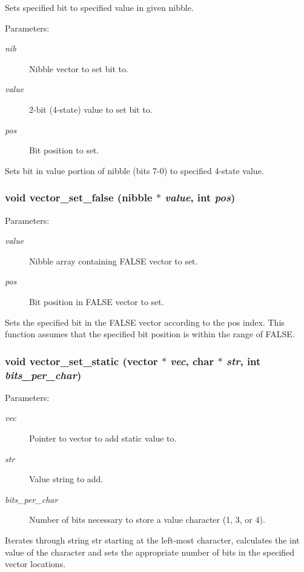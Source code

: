 Sets specified bit to specified value in given nibble. 

\begin{Desc}
\item[Parameters:]
\begin{description}
\item[{\em nib}]Nibble vector to set bit to. \item[{\em value}]2-bit (4-state) value to set bit to. \item[{\em pos}]Bit position to set.\end{description}
\end{Desc}
Sets bit in value portion of nibble (bits 7-0) to specified 4-state value. 
\subsubsection{\setlength{\rightskip}{0pt plus 5cm}void vector\_\-set\_\-false ({\bf nibble} $\ast$ {\em value}, int {\em pos})}\label{vector_8c_a22}


\begin{Desc}
\item[Parameters:]
\begin{description}
\item[{\em value}]Nibble array containing FALSE vector to set. \item[{\em pos}]Bit position in FALSE vector to set.\end{description}
\end{Desc}
Sets the specified bit in the FALSE vector according to the pos index. This function assumes that the specified bit position is within the range of FALSE. 
\subsubsection{\setlength{\rightskip}{0pt plus 5cm}void vector\_\-set\_\-static ({\bf vector} $\ast$ {\em vec}, char $\ast$ {\em str}, int {\em bits\_\-per\_\-char})}\label{vector_8c_a32}


\begin{Desc}
\item[Parameters:]
\begin{description}
\item[{\em vec}]Pointer to vector to add static value to. \item[{\em str}]Value string to add. \item[{\em bits\_\-per\_\-char}]Number of bits necessary to store a value character (1, 3, or 4).\end{description}
\end{Desc}
Iterates through string str starting at the left-most character, calculates the int value of the character and sets the appropriate number of bits in the specified vector locations. 
